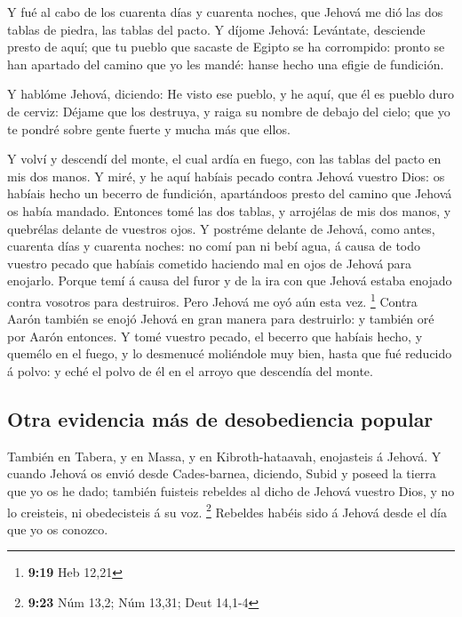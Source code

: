  Y fué al cabo de los cuarenta días y cuarenta noches,
que Jehová me dió las dos tablas de piedra, las tablas del pacto.
 Y díjome Jehová: Levántate, desciende presto de aquí;
que tu pueblo que sacaste de Egipto se ha corrompido: pronto se han
apartado del camino que yo les mandé: hanse hecho una efigie de
fundición.

 Y hablóme Jehová, diciendo: He visto ese pueblo, y he
aquí, que él es pueblo duro de cerviz:  Déjame que los
destruya, y raiga su nombre de debajo del cielo; que yo te pondré sobre
gente fuerte y mucha más que ellos.

 Y volví y descendí del monte, el cual ardía en fuego,
con las tablas del pacto en mis dos manos.  Y miré, y he
aquí habíais pecado contra Jehová vuestro Dios: os habíais hecho un
becerro de fundición, apartándoos presto del camino que Jehová os había
mandado.  Entonces tomé las dos tablas, y arrojélas de
mis dos manos, y quebrélas delante de vuestros ojos.  Y
postréme delante de Jehová, como antes, cuarenta días y cuarenta noches:
no comí pan ni bebí agua, á causa de todo vuestro pecado que habíais
cometido haciendo mal en ojos de Jehová para enojarlo. 
Porque temí á causa del furor y de la ira con que Jehová estaba enojado
contra vosotros para destruiros. Pero Jehová me oyó aún esta vez.
\footnote{\textbf{9:19} Heb 12,21}  Contra Aarón también
se enojó Jehová en gran manera para destruirlo: y también oré por Aarón
entonces.  Y tomé vuestro pecado, el becerro que habíais
hecho, y quemélo en el fuego, y lo desmenucé moliéndole muy bien, hasta
que fué reducido á polvo: y eché el polvo de él en el arroyo que
descendía del monte.

\hypertarget{otra-evidencia-muxe1s-de-desobediencia-popular}{%
\subsection{Otra evidencia más de desobediencia
popular}\label{otra-evidencia-muxe1s-de-desobediencia-popular}}

 También en Tabera, y en Massa, y en Kibroth-hataavah,
enojasteis á Jehová.  Y cuando Jehová os envió desde
Cades-barnea, diciendo, Subid y poseed la tierra que yo os he dado;
también fuisteis rebeldes al dicho de Jehová vuestro Dios, y no lo
creisteis, ni obedecisteis á su voz. \footnote{\textbf{9:23} Núm 13,2;
  Núm 13,31; Deut 14,1-4}  Rebeldes habéis sido á Jehová
desde el día que yo os conozco.

